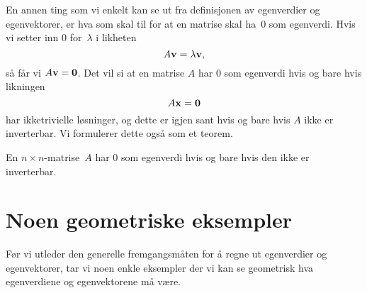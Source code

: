 En annen ting som vi enkelt kan se ut fra definisjonen av egenverdier
og egenvektorer, er hva som skal til for at en matrise skal ha~$0$ som
egenverdi.  Hvis vi setter inn $0$ for~$\lambda$ i likheten
\[
A \mathbf{v} = \lambda \mathbf{v},
\]
så får vi $A \mathbf{v} = \mathbf{0}$.  Det vil si at en matrise $A$ har $0$ som
egenverdi hvis og bare hvis likningen
\[
A \mathbf{x} = \mathbf{0}
\]
har ikketrivielle løsninger, og dette er igjen sant hvis og bare hvis
$A$ ikke er inverterbar.  Vi formulerer dette også som et teorem.

\begin{thm}
\label{thm:egenverdi-0}
En $n \times n$-matrise~$A$ har $0$ som egenverdi hvis og bare hvis
den ikke er inverterbar.
\end{thm}


\section*{Noen geometriske eksempler}

Før vi utleder den generelle fremgangsmåten for å regne ut egenverdier
og egenvektorer, tar vi noen enkle eksempler der vi kan se geometrisk
hva egenverdiene og egenvektorene må være.

